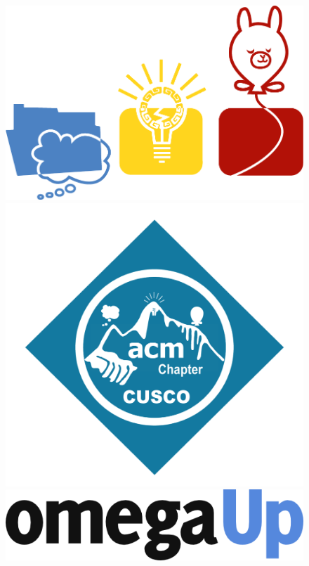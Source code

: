 \clearpage\thispagestyle{empty}

\begin{figure}
    \centering
    \begin{minipage}{.32\textwidth}
        \centering
        \includegraphics[height=.40\linewidth]{images/logo_cp.png}
    \end{minipage}
    \begin{minipage}{.32\textwidth}
        \centering
        \includegraphics[height=.53\linewidth]{images/logo_acm.png}
    \end{minipage}
    \begin{minipage}{.32\textwidth}
        \centering
        \includegraphics[height=.22\linewidth]{images/logo_omegaup.png}
    \end{minipage}
\end{figure}

